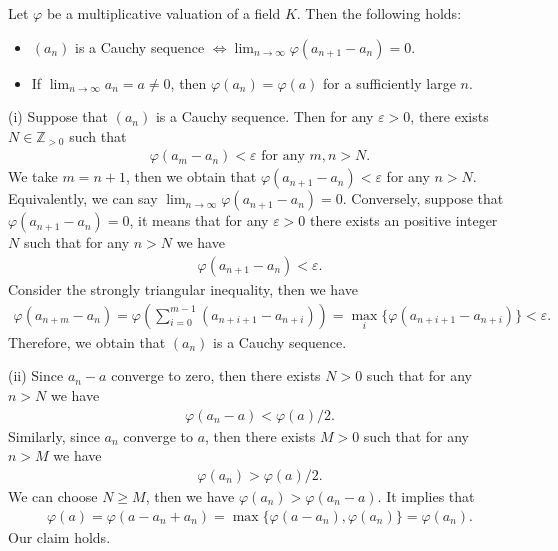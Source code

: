 Let $\varphi$ be a multiplicative valuation of a field $K$. Then the following holds:
\begin{itemize}
    \item[(i)] $(a_n)$ is a Cauchy sequence $\Leftrightarrow \lim_{n\to\infty} \varphi(a_{n+1} - a_n) = 0$.
    \item[(ii)] If $\lim_{n\to\infty} a_n = a \neq 0$, then $\varphi(a_n) = \varphi(a)$ for a sufficiently large $n$.
\end{itemize}
\begin{solution}
    (i) Suppose that $(a_n)$ is a Cauchy sequence. Then for any $\varepsilon>0$, there exists $N\in \mathbb{Z}_{>0}$ such that 
    \begin{align*}
        \varphi(a_m-a_n)<\varepsilon \text{ for any }m,n>N.
    \end{align*}
    We take $m=n+1$, then we obtain that $\varphi(a_{n+1}-a_n)<\varepsilon$ for any $n>N$. Equivalently, we can say $\lim_{n\to\infty} \varphi(a_{n+1} - a_n) = 0$.
    Conversely, suppose that $\varphi(a_{n+1} - a_n) = 0$, it means that for any $\varepsilon>0$ there exists an positive integer $N$ such that for any $n>N$ we have 
    \begin{align*}
        \varphi(a_{n+1}-a_n)<\varepsilon.
    \end{align*}
    Consider the strongly triangular inequality, then we have 
    \begin{align*}
        \varphi(a_{n+m}-a_n)=\varphi\left(\sum_{i=0}^{m-1}(a_{n+i+1}-a_{n+i})\right) = \max_{i}\{\varphi(a_{n+i+1}-a_{n+i})\}<\varepsilon.
    \end{align*}
    Therefore, we obtain that $(a_n)$ is a Cauchy sequence.

    (ii) Since $a_n-a$ converge to zero, then there exists $N>0$ such that for any $n>N$ we have 
    \begin{align*}
        \varphi(a_n-a)<\varphi(a)/2.
    \end{align*}
    Similarly, since $a_n$ converge to $a$, then there exists $M>0$ such that for any $n>M$ we have 
    \begin{align*}
        \varphi(a_n)>\varphi(a)/2.
    \end{align*}
    We can choose $N\ge M$, then we have $\varphi(a_n)>\varphi(a_n-a)$. It implies that 
    \begin{align*}
        \varphi(a)=\varphi(a-a_n+a_n)= \max\{\varphi(a-a_n),\varphi(a_n)\}=\varphi(a_n).
    \end{align*}
    Our claim holds.
\end{solution}


